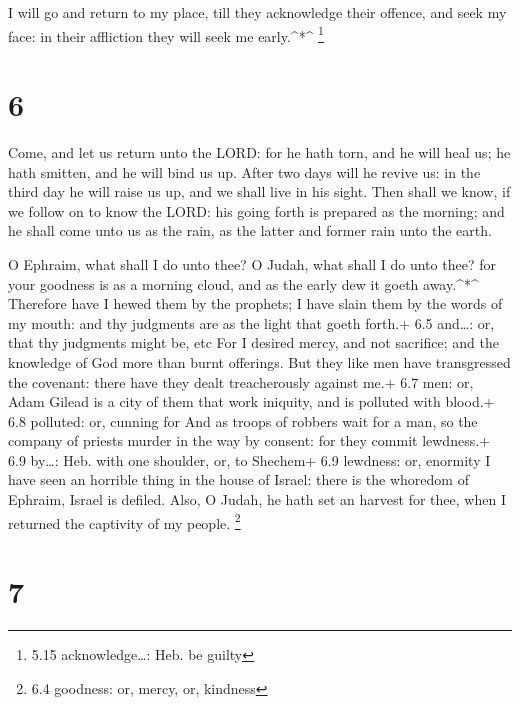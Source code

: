  I will go and return to my place, till they acknowledge
their offence, and seek my face: in their affliction they will seek me
early.\^{}*\^{} \footnote{5.15 acknowledge\ldots: Heb. be guilty}

\hypertarget{section-5}{%
\section{6}\label{section-5}}

 Come, and let us return unto the LORD: for he hath torn,
and he will heal us; he hath smitten, and he will bind us up.
 After two days will he revive us: in the third day he will
raise us up, and we shall live in his sight.  Then shall we
know, if we follow on to know the LORD: his going forth is prepared as
the morning; and he shall come unto us as the rain, as the latter and
former rain unto the earth.

 O Ephraim, what shall I do unto thee? O Judah, what shall I
do unto thee? for your goodness is as a morning cloud, and as the early
dew it goeth away.\^{}*\^{}  Therefore have I hewed them by
the prophets; I have slain them by the words of my mouth: and thy
judgments are as the light that goeth forth.+ 6.5 and\ldots: or, that
thy judgments might be, etc  For I desired mercy, and not
sacrifice; and the knowledge of God more than burnt offerings.
 But they like men have transgressed the covenant: there
have they dealt treacherously against me.+ 6.7 men: or, Adam
 Gilead is a city of them that work iniquity, and is
polluted with blood.+ 6.8 polluted: or, cunning for  And as
troops of robbers wait for a man, so the company of priests murder in
the way by consent: for they commit lewdness.+ 6.9 by\ldots: Heb. with
one shoulder, or, to Shechem+ 6.9 lewdness: or, enormity  I
have seen an horrible thing in the house of Israel: there is the
whoredom of Ephraim, Israel is defiled.  Also, O Judah, he
hath set an harvest for thee, when I returned the captivity of my
people. \footnote{6.4 goodness: or, mercy, or, kindness}

\hypertarget{section-6}{%
\section{7}\label{section-6}}

